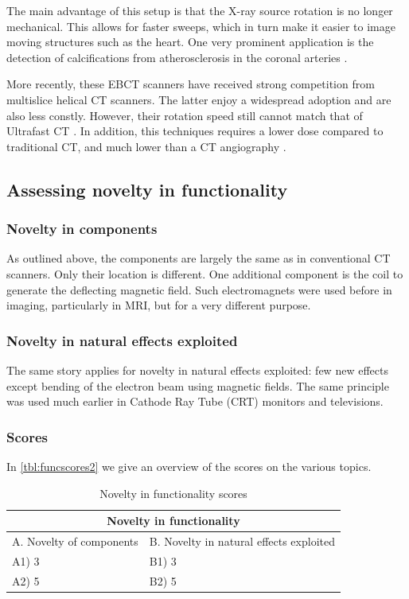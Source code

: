 The main advantage of this setup is that the X-ray source rotation is no longer
mechanical. This allows for faster sweeps, which in turn make it easier to image
moving structures such as the heart. One very prominent application is the
detection of calcifications from atherosclerosis in the coronal arteries
\cite{ultrafastcad}.

More recently, these EBCT scanners have received strong competition from
multislice helical CT scanners. The latter enjoy a widespread adoption and are
also less constly. However, their rotation speed still cannot match that of
Ultrafast CT \cite{ultravshelical}. In addition, this techniques requires a
lower dose compared to traditional CT, and much lower than a CT angiography
\cite{ultralowdose}.

\subsection{Assessing novelty in functionality}

\subsubsection{Novelty in components}
As outlined above, the components are largely the same as in conventional CT
scanners. Only their location is different. One additional component is the coil
to generate the deflecting magnetic field. Such electromagnets were used before
in imaging, particularly in MRI, but for a very different purpose.

\subsubsection{Novelty in natural effects exploited}
The same story applies for novelty in natural effects exploited: few new effects
except bending of the electron beam using magnetic fields. The same principle
was used much earlier in Cathode Ray Tube (CRT) monitors and televisions.

\subsubsection{Scores}
In \autoref{tbl:funcscores2} we give an overview of the scores on the various
topics.

\begin{table}[h]
\centering
\begin{tabular}{l l}
\hline
\multicolumn{2}{|c|}{Novelty in functionality} \\
\hline
A. Novelty of components & B. Novelty in natural effects exploited\\
A1) 3 & B1) 3\\ 
A2) 5 & B2) 5\\ 
\hline
\end{tabular}
\caption{Novelty in functionality scores}
\label{tbl:funcscores2}
\end{table}

